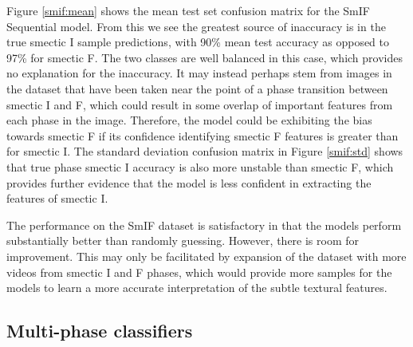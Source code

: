 \documentclass[12pt]{article}
\begin{document}
Figure \ref{smif:mean} shows the mean test set confusion matrix for the SmIF Sequential model. From this we see the greatest source of inaccuracy is in the true smectic I sample predictions, with 90\% mean test accuracy as opposed to 97\% for smectic F. The two classes are well balanced in this case, which provides no explanation for the inaccuracy. It may instead perhaps stem from images in the dataset that have been taken near the point of a phase transition between smectic I and F, which could result in some overlap of important features from each phase in the image. Therefore, the model could be exhibiting the bias towards smectic F if its confidence identifying smectic F features is greater than for smectic I. The standard deviation confusion matrix in Figure \ref{smif:std} shows that true phase smectic I accuracy is also more unstable than smectic F, which provides further evidence that the model is less confident in extracting the features of smectic I.

The performance on the SmIF dataset is satisfactory in that the models perform substantially better than randomly guessing. However, there is room for improvement. This may only be facilitated by expansion of the dataset with more videos from smectic I and F phases, which would provide more samples for the models to learn a more accurate interpretation of the subtle textural features.

\subsection{Multi-phase classifiers}
\end{document}
